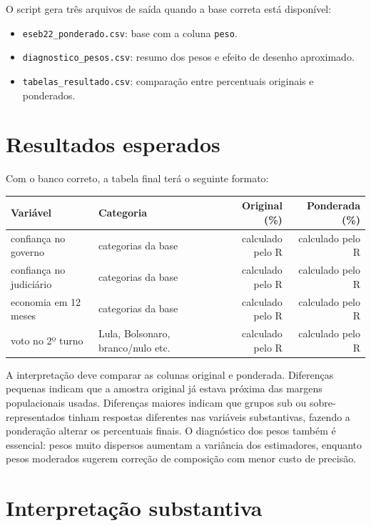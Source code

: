 \documentclass[11pt,a4paper]{article}
\begin{document}
O script gera três arquivos de saída quando a base correta está disponível:
\begin{itemize}
\item \texttt{eseb22\_ponderado.csv}: base com a coluna \texttt{peso}.
\item \texttt{diagnostico\_pesos.csv}: resumo dos pesos e efeito de desenho aproximado.
\item \texttt{tabelas\_resultado.csv}: comparação entre percentuais originais e ponderados.
\end{itemize}

\section*{Resultados esperados}

Com o banco correto, a tabela final terá o seguinte formato:

\begin{center}
\begin{tabularx}{0.95\textwidth}{lXrr}
\toprule
Variável & Categoria & Original (\%) & Ponderada (\%) \\
\midrule
confiança no governo & categorias da base & calculado pelo R & calculado pelo R \\
confiança no judiciário & categorias da base & calculado pelo R & calculado pelo R \\
economia em 12 meses & categorias da base & calculado pelo R & calculado pelo R \\
voto no 2º turno & Lula, Bolsonaro, branco/nulo etc. & calculado pelo R & calculado pelo R \\
\bottomrule
\end{tabularx}
\end{center}

A interpretação deve comparar as colunas original e ponderada. Diferenças pequenas indicam que a amostra original já estava próxima das margens populacionais usadas. Diferenças maiores indicam que grupos sub ou sobre-representados tinham respostas diferentes nas variáveis substantivas, fazendo a ponderação alterar os percentuais finais. O diagnóstico dos pesos também é essencial: pesos muito dispersos aumentam a variância dos estimadores, enquanto pesos moderados sugerem correção de composição com menor custo de precisão.

\section*{Interpretação substantiva}
\end{document}
